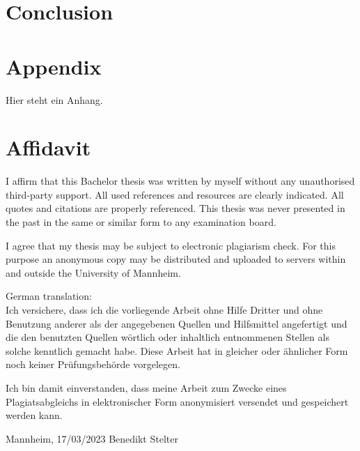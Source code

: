 \documentclass{scrbook}
\begin{document}
\chapter{Conclusion}

 
\backmatter
 
\renewcommand\refname{References}
\printbibliography[title=References]

\chapter{Appendix}
Hier steht ein Anhang.



\chapter{Affidavit}
\thispagestyle{empty}

I affirm that this Bachelor thesis was written by myself without any unauthorised third-party support. All used references and resources are clearly indicated. All quotes and citations are properly referenced. This thesis was never presented in the past in the same or similar form to any examination board. 

\noindent I agree that my thesis may be subject to electronic plagiarism check. For this purpose an anonymous copy may be distributed and uploaded to
servers within and outside the University of Mannheim.

\vspace{2\baselineskip}

\noindent German translation:\\
Ich versichere, dass ich die vorliegende Arbeit ohne Hilfe Dritter und ohne Benutzung anderer
als der angegebenen Quellen und Hilfsmittel angefertigt und die den benutzten Quellen
wörtlich oder inhaltlich entnommenen Stellen als solche kenntlich gemacht habe. Diese Arbeit
hat in gleicher oder ähnlicher Form noch keiner Prüfungsbehörde vorgelegen.

\noindent Ich bin damit einverstanden, dass meine Arbeit zum Zwecke eines Plagiatsabgleichs in
elektronischer Form anonymisiert versendet und gespeichert werden kann.

\vspace{4\baselineskip}
\begin{center}
\parbox{.8\textwidth}{Mannheim, 17/03/2023 \hfill Benedikt Stelter}
\end{center}


 
\end{document}
